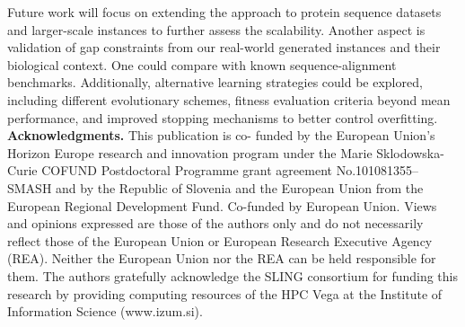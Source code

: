 \documentclass[runningheads]{llncs}
\begin{document}
Future work will focus on extending the approach to protein sequence datasets and larger-scale instances to further assess the scalability. Another aspect is validation of gap constraints from our real-world generated instances and their biological context. One could compare with known sequence-alignment benchmarks.  Additionally, alternative learning strategies could be explored, including different evolutionary schemes, fitness evaluation criteria beyond mean performance, and improved stopping mechanisms to better control overfitting.\\
 \footnotesize{\textbf{Acknowledgments.}    This publication is co- funded by the European Union’s Horizon Europe research and innovation program under the Marie Sklodowska-Curie COFUND Postdoctoral Programme grant agreement No.101081355-- SMASH and by the Republic of Slovenia and the European Union from the European Regional Development Fund. Co-funded by European Union.  Views and opinions expressed are those of the authors only and do not necessarily reflect those of the European Union or European Research Executive Agency (REA). Neither the European Union nor the REA can be held responsible for them.  The authors gratefully acknowledge the SLING consortium for funding this research by providing computing resources of the HPC Vega at the Institute of Information Science (www.izum.si).}
	
	
	
	
	
	
	
\end{document}
